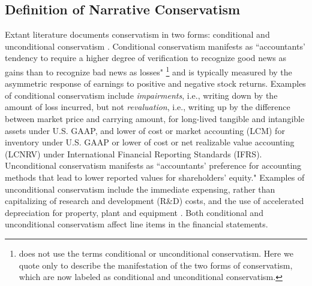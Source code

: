 \documentclass[letterpaper,12pt]{article}
\begin{document}
\begin{spacing}{1.5}
\subsection{Definition of Narrative Conservatism}\label{sec2.2}
\noindent Extant literature documents conservatism in two forms: conditional and unconditional conservatism \cite{beaverConditionalUnconditionalConservatism2005}. Conditional conservatism manifests as ``accountants' tendency to require a higher degree of verification to recognize good news as gains than to recognize bad news as losses" \cite[p. 7]{basuConservatismPrincipleAsymmetric1997}\footnote{ does not use the terms conditional or unconditional conservatism. Here we quote  only to describe the manifestation of the two forms of conservatism, which are now labeled as conditional and unconditional conservatism.} and is typically measured by the asymmetric response of earnings to positive and negative stock returns. Examples of conditional conservatism include \textit{impairments}, i.e., writing down by the amount of loss incurred, but not \textit{revaluation}, i.e., writing up by the difference between market price and carrying amount, for long-lived tangible and intangible assets under U.S. GAAP, and lower of cost or market accounting (LCM) for inventory under U.S. GAAP or lower of cost or net realizable value accounting (LCNRV) under International Financial Reporting Standards (IFRS). Unconditional conservatism manifests as ``accountants' preference for accounting methods that lead to lower reported values for shareholders' equity." \cite[p. 8]{basuConservatismPrincipleAsymmetric1997} Examples of unconditional conservatism include the immediate expensing, rather than capitalizing of research and development (R\&D) costs, and the use of accelerated depreciation for property, plant and equipment \cite{beaverConditionalUnconditionalConservatism2005}. Both conditional and unconditional conservatism affect line items in the financial statements. 


\end{spacing}
\end{document}

